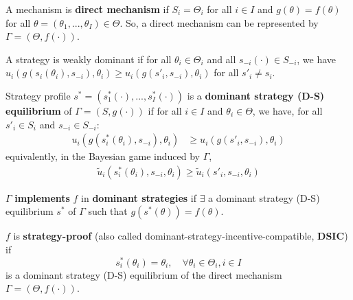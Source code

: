 \documentclass[11pt]{elegantbook}
\begin{document}
\begin{definition}
    \normalfont
    A mechanism is \textbf{direct mechanism} if $S_i=\Theta_i$ for all $i\in I$ and $g(\theta)=f(\theta)$ for all $\theta=(\theta_1,...,\theta_I)\in\Theta$. So, a direct mechanism can be represented by $\Gamma=(\Theta,f(\cdot))$.
\end{definition}


A strategy is weakly dominant if for all $\theta_i\in\Theta_i$ and all $s_{-i}(\cdot)\in S_{-i}$, we have $u_i(g(s_i(\theta_i),s_{-i}),\theta_i)\geq u_i(g(s'_i,s_{-i}),\theta_i)$ for all $s'_i\neq s_i$.


\begin{definition}
    \normalfont
    Strategy profile $s^*=(s_1^*(\cdot),...,s_I^*(\cdot))$ is a \textbf{dominant strategy (D-S) equilibrium} of $\Gamma=(S,g(\cdot))$ if for all $i\in I$ and $\theta_i\in \Theta$, we have, for all $s'_i\in S_i$ and $s_{-i}\in S_{-i}$:
    \begin{equation}
        \begin{aligned}
            u_i(g(s_i^*(\theta_i),s_{-i}),\theta_i)&\geq u_i(g(s'_i,s_{-i}),\theta_i)
        \end{aligned}
        \nonumber
    \end{equation}
    equivalently, in the Bayesian game induced by $\Gamma$,
    \begin{equation}
        \begin{aligned}
            \tilde{u}_i(s_i^*(\theta_i),s_{-i},\theta_i)\geq \tilde{u}_i(s'_i,s_{-i},\theta_i)
        \end{aligned}
        \nonumber
    \end{equation}
\end{definition}

\begin{definition}
    \normalfont
    $\Gamma$ \textbf{implements} $f$ in \textbf{dominant strategies} if $\exists$ a dominant strategy (D-S) equilibrium $s^*$ of $\Gamma$ such that $g(s^*(\theta))=f(\theta)$.
\end{definition}

\begin{definition}
    \normalfont
    $f$ is \textbf{strategy-proof} (also called dominant-strategy-incentive-compatible, \textbf{DSIC}) if $$s^*_i(\theta_i)=\theta_i,\quad \forall \theta_i\in\Theta_i,i\in I$$ is a dominant strategy (D-S) equilibrium of the direct mechanism $\Gamma=(\Theta,f(\cdot))$.
\end{definition}
\end{document}
